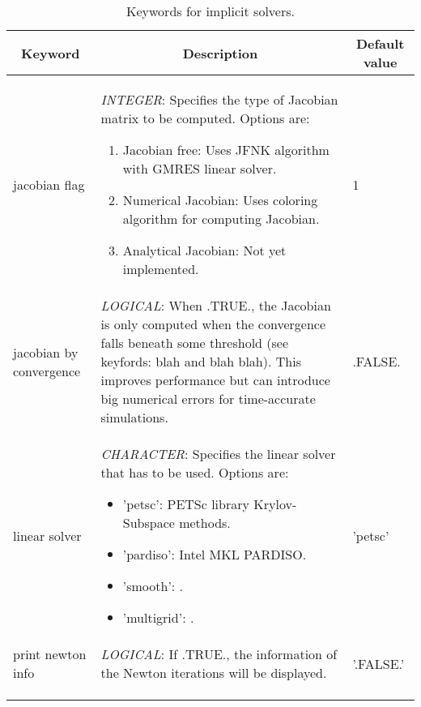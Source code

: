 \documentclass[a4paper,10pt]{report}
\begin{document}
\begin{table}[htbp]
\caption{Keywords for implicit solvers.}
\begin{tabular}{|l|p{10cm}|p{2.2cm}|}
\hline
\multicolumn{1}{|c|}{Keyword} & \multicolumn{1}{c|}{Description} & \multicolumn{1}{c|}{Default value} \\ \hline

jacobian flag           & \textit{INTEGER}: Specifies the type of Jacobian matrix to be computed. Options are:\
				\begin{enumerate}
					\item Jacobian free: Uses JFNK algorithm with GMRES linear solver.
					\item Numerical Jacobian: Uses coloring algorithm for computing Jacobian.
					\item Analytical Jacobian: Not yet implemented.
					\end{enumerate}
										& 1 \\ \hline

jacobian by convergence & \textit{LOGICAL}: When .TRUE., the Jacobian is only computed when the convergence falls beneath some threshold (see keyfords: blah and blah blah). This improves performance but can introduce big numerical errors for time-accurate simulations.  & .FALSE. \\ \hline

linear solver           & \textit{CHARACTER}: Specifies the linear solver that has to be used. Options are:\ 
				\begin{itemize}
					\item 'petsc': PETSc library Krylov-Subspace methods.
					\item 'pardiso': Intel MKL PARDISO.
					\item 'smooth': .
					\item 'multigrid': .
				\end{itemize}
										& 'petsc'  \\ \hline
print newton info       & \textit{LOGICAL}: If .TRUE., the information of the Newton iterations will be displayed. &  '.FALSE.'\\ \hline
  &  &  \\ \hline
   &  &  \\ \hline
    &  &  \\ \hline
\end{tabular}
\label{tab:implicitkey}
\end{table}
\end{document}
